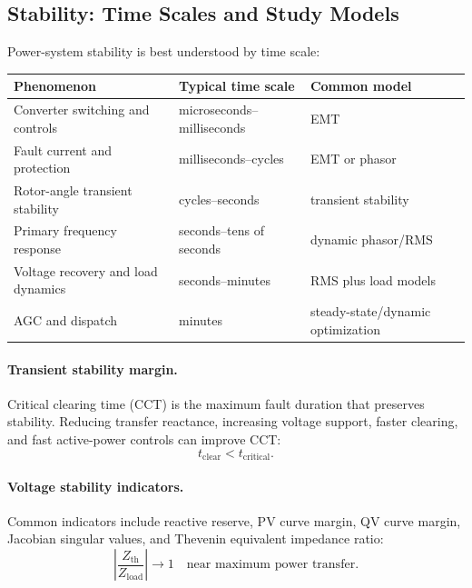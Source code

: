 \documentclass[11pt]{article}
\begin{document}
\subsection{Stability: Time Scales and Study Models}
Power-system stability is best understood by time scale:
\begin{center}
\begin{tabular}{lll}
\toprule
Phenomenon & Typical time scale & Common model \\
\midrule
Converter switching and controls & microseconds--milliseconds & EMT \\
Fault current and protection & milliseconds--cycles & EMT or phasor \\
Rotor-angle transient stability & cycles--seconds & transient stability \\
Primary frequency response & seconds--tens of seconds & dynamic phasor/RMS \\
Voltage recovery and load dynamics & seconds--minutes & RMS plus load models \\
AGC and dispatch & minutes & steady-state/dynamic optimization \\
\bottomrule
\end{tabular}
\end{center}

\paragraph{Transient stability margin.}
Critical clearing time (CCT) is the maximum fault duration that preserves
stability. Reducing transfer reactance, increasing voltage support, faster
clearing, and fast active-power controls can improve CCT:
\begin{equation}
t_{\mathrm{clear}}<t_{\mathrm{critical}}.
\end{equation}

\paragraph{Voltage stability indicators.}
Common indicators include reactive reserve, PV curve margin, QV curve margin,
Jacobian singular values, and Thevenin equivalent impedance ratio:
\begin{equation}
\left|\frac{Z_{\mathrm{th}}}{Z_{\mathrm{load}}}\right|\rightarrow 1
\quad \text{near maximum power transfer}.
\end{equation}
\end{document}
